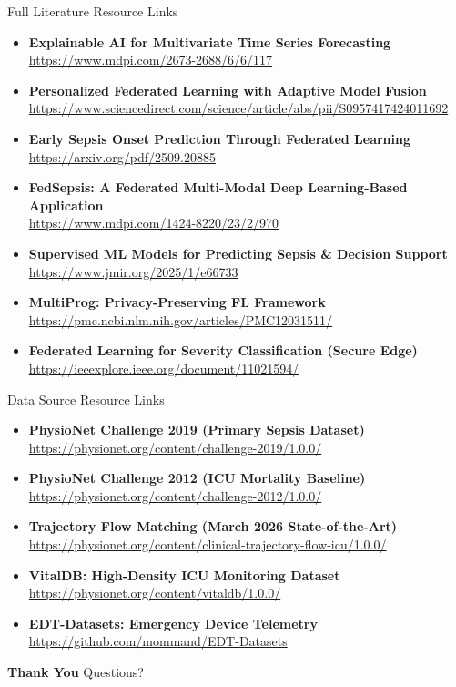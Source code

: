 \documentclass[aspectratio=169, 11pt]{beamer}
\begin{document}
\begin{frame}[allowframebreaks]{Full Literature Resource Links}
\begin{itemize}
        \item \textbf{\small Explainable AI for Multivariate Time Series Forecasting} \\ \url{https://www.mdpi.com/2673-2688/6/6/117}
        \item \textbf{\small Personalized Federated Learning with Adaptive Model Fusion} \\ \url{https://www.sciencedirect.com/science/article/abs/pii/S0957417424011692}
        \item \textbf{\small Early Sepsis Onset Prediction Through Federated Learning} \\ \url{https://arxiv.org/pdf/2509.20885}
        \item \textbf{\small FedSepsis: A Federated Multi-Modal Deep Learning-Based Application} \\ \url{https://www.mdpi.com/1424-8220/23/2/970}
        \item \textbf{\small Supervised ML Models for Predicting Sepsis \& Decision Support} \\ \url{https://www.jmir.org/2025/1/e66733}
        \item \textbf{\small MultiProg: Privacy-Preserving FL Framework} \\ \url{https://pmc.ncbi.nlm.nih.gov/articles/PMC12031511/}
        \item \textbf{\small Federated Learning for Severity Classification (Secure Edge)} \\ \url{https://ieeexplore.ieee.org/document/11021594/}
    \end{itemize}
\end{frame}

\begin{frame}[allowframebreaks]{Data Source Resource Links}
    \begin{itemize}
        \item \textbf{\small PhysioNet Challenge 2019 (Primary Sepsis Dataset)} \\ \url{https://physionet.org/content/challenge-2019/1.0.0/}
        \item \textbf{\small PhysioNet Challenge 2012 (ICU Mortality Baseline)} \\ \url{https://physionet.org/content/challenge-2012/1.0.0/}
        \item \textbf{\small Trajectory Flow Matching (March 2026 State-of-the-Art)} \\ \url{https://physionet.org/content/clinical-trajectory-flow-icu/1.0.0/}
        \item \textbf{\small VitalDB: High-Density ICU Monitoring Dataset} \\ \url{https://physionet.org/content/vitaldb/1.0.0/}
        \item \textbf{\small EDT-Datasets: Emergency Device Telemetry} \\ \url{https://github.com/mommand/EDT-Datasets}
    \end{itemize}
\end{frame}

\begin{frame}
    \centering
    {\Huge \textbf{\textcolor{amritaMaroon}{Thank You}}}
    \vspace{0.5cm}
    {\large Questions?}
\end{frame}
\end{document}
